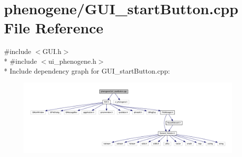 \hypertarget{a00012}{\section{phenogene/\-G\-U\-I\-\_\-start\-Button.cpp File Reference}
\label{df/d86/a00012}
}
{\ttfamily \#include $<$G\-U\-I.\-h$>$}\\*
{\ttfamily \#include $<$ui\-\_\-phenogene.\-h$>$}\\*
Include dependency graph for G\-U\-I\-\_\-start\-Button.\-cpp\-:\nopagebreak
\begin{figure}[H]
\begin{center}
\leavevmode
\includegraphics[width=350pt]{d0/dc0/a00033}
\end{center}
\end{figure}
